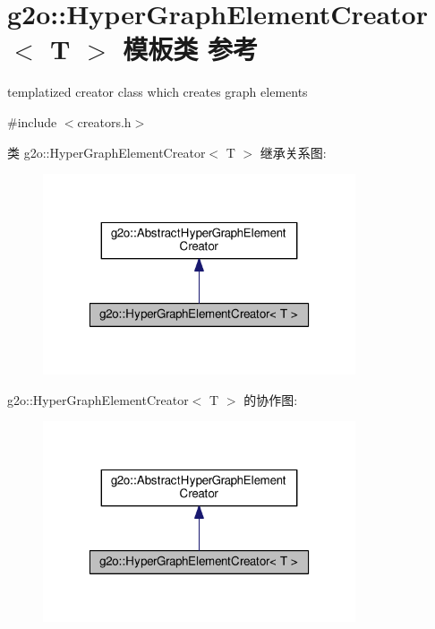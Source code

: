 \hypertarget{classg2o_1_1HyperGraphElementCreator}{\section{g2o\-:\-:Hyper\-Graph\-Element\-Creator$<$ T $>$ 模板类 参考}
\label{classg2o_1_1HyperGraphElementCreator}
}


templatized creator class which creates graph elements  




{\ttfamily \#include $<$creators.\-h$>$}



类 g2o\-:\-:Hyper\-Graph\-Element\-Creator$<$ T $>$ 继承关系图\-:
\nopagebreak
\begin{figure}[H]
\begin{center}
\leavevmode
\includegraphics[width=262pt]{classg2o_1_1HyperGraphElementCreator__inherit__graph}
\end{center}
\end{figure}


g2o\-:\-:Hyper\-Graph\-Element\-Creator$<$ T $>$ 的协作图\-:
\nopagebreak
\begin{figure}[H]
\begin{center}
\leavevmode
\includegraphics[width=262pt]{classg2o_1_1HyperGraphElementCreator__coll__graph}
\end{center}
\end{figure}
